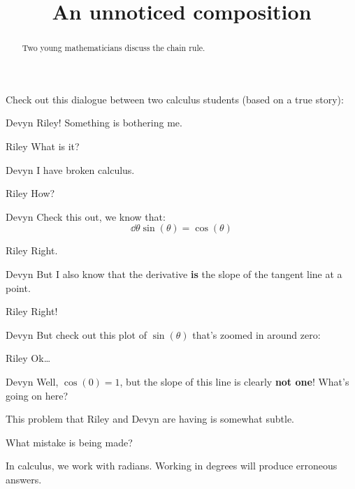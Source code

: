 \documentclass{ximera}
\title[Break-Ground:]{An unnoticed composition}
\begin{document}
\begin{abstract}
Two young mathematicians discuss the chain rule.
\end{abstract}
\maketitle

Check out this dialogue between two calculus students (based on a true
story):

\begin{dialogue}
\item[Devyn] Riley! Something is bothering me. 
\item[Riley] What is it?
\item[Devyn] I have broken calculus. 
\item[Riley] How?
\item[Devyn] Check this out, we know that:
  \[
  \dd{\theta} \sin(\theta) = \cos(\theta)
  \]
\item[Riley] Right. 
\item[Devyn] But I also know that the derivative \textbf{is} the slope
  of the tangent line at a point.
\item[Riley] Right!
\item[Devyn] But check out this plot of $\sin(\theta)$ that's zoomed in around zero:
  \begin{image}
  \end{image}
\item[Riley] Ok\dots
\item[Devyn] Well, $\cos(0) = 1$, but the slope of this line is
  clearly \textbf{not one}! What's going on here?
\end{dialogue}

This problem that Riley and Devyn are having is somewhat subtle. 

\begin{question}
  What mistake is being made?

\begin{multipleChoice}
\end{multipleChoice}
\begin{feedback}
  In calculus, we work with radians. Working in degrees will produce
  erroneous answers.
\end{feedback}
\end{question}



\end{document}
